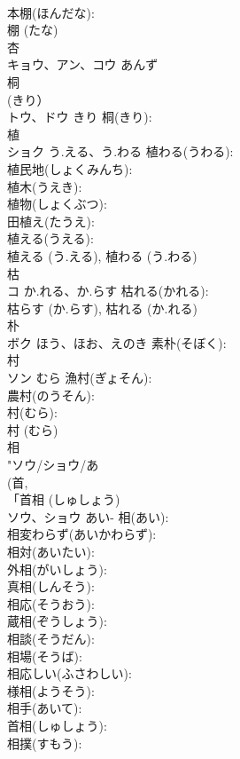 \documentclass[8pt]{extreport}
\begin{document}
\begin{CJK}{UTF8}{min}
\\	本棚(ほんだな): 
\\	棚 (たな)
\\	杏			
\\	キョウ、アン、コウ	あんず		
\\	桐			
\\	(きり）
\\	トウ、ドウ	きり	桐(きり): 
\\	植			
\\	ショク	う.える、う.わる	植わる(うわる): 
\\	植民地(しょくみんち): 
\\	植木(うえき): 
\\	植物(しょくぶつ): 
\\	田植え(たうえ): 
\\	植える(うえる): 
\\	植える (う.える), 植わる (う.わる)
\\	枯			
\\	コ	か.れる、か.らす	枯れる(かれる): 
\\	枯らす (か.らす), 枯れる (か.れる)
\\	朴			
\\	ボク	ほう、ほお、えのき	素朴(そぼく): 
\\	村			
\\	ソン	むら	漁村(ぎょそん): 
\\	農村(のうそん): 
\\	村(むら): 
\\	村 (むら)
\\	相			
\\	"ソウ/ショウ/あ 
\\	(首, 
\\	「首相 (しゅしょう)
\\	ソウ、ショウ	あい-	相(あい): 
\\	相変わらず(あいかわらず): 
\\	相対(あいたい): 
\\	外相(がいしょう): 
\\	真相(しんそう): 
\\	相応(そうおう): 
\\	蔵相(ぞうしょう): 
\\	相談(そうだん): 
\\	相場(そうば): 
\\	相応しい(ふさわしい): 
\\	様相(ようそう): 
\\	相手(あいて): 
\\	首相(しゅしょう): 
\\	相撲(すもう): 

\end{CJK}
\end{document}
